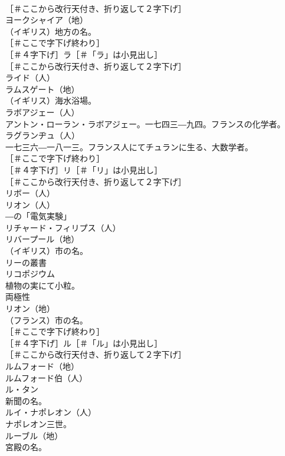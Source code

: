\documentclass[8pt]{extreport}
\begin{document}
\begin{CJK}{UTF8}{min}
\\	［＃ここから改行天付き、折り返して２字下げ］
\\	ヨークシャイア（地）
\\	（イギリス）地方の名。
\\	［＃ここで字下げ終わり］
\\	［＃４字下げ］ラ［＃「ラ」は小見出し］
\\	［＃ここから改行天付き、折り返して２字下げ］
\\	ライド（人）
\\	ラムスゲート（地）
\\	（イギリス）海水浴場。
\\	ラボアジェー（人）
\\	アントン・ローラン・ラボアジェー。一七四三―九四。フランスの化学者。
\\	ラグランヂュ（人）
\\	一七三六―一八一三。フランス人にてチュランに生る、大数学者。
\\	［＃ここで字下げ終わり］
\\	［＃４字下げ］リ［＃「リ」は小見出し］
\\	［＃ここから改行天付き、折り返して２字下げ］
\\	リボー（人）
\\	リオン（人）
\\	―の「電気実験」
\\	リチャード・フィリプス（人）
\\	リバープール（地）
\\	（イギリス）市の名。
\\	リーの叢書 
\\	リコポジウム 
\\	植物の実にて小粒。
\\	両極性 
\\	リオン（地）
\\	（フランス）市の名。
\\	［＃ここで字下げ終わり］
\\	［＃４字下げ］ル［＃「ル」は小見出し］
\\	［＃ここから改行天付き、折り返して２字下げ］
\\	ルムフォード（地）
\\	ルムフォード伯（人）
\\	ル・タン 
\\	新聞の名。
\\	ルイ・ナポレオン（人）
\\	ナポレオン三世。
\\	ルーブル（地）
\\	宮殿の名。

\end{CJK}
\end{document}
